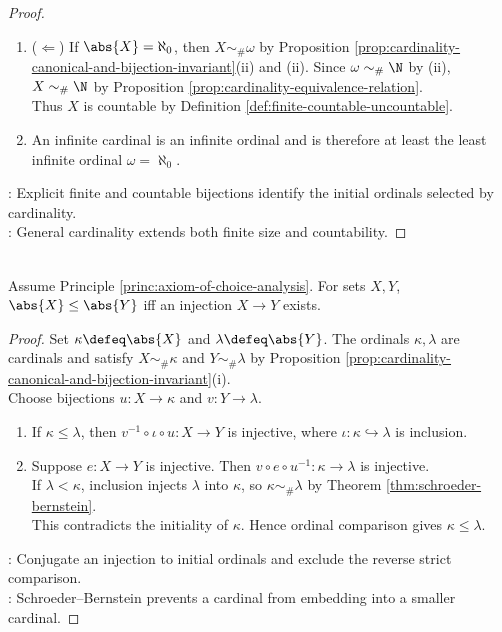 \begin{proposition}
\begin{proof}
\begin{enumerate}[label=(\roman*)]
Hence $\abs{X}=\aleph_0$ by Proposition \ref{prop:cardinality-canonical-and-bijection-invariant}(ii) and (ii).
\item[$(iii)$] ($\Leftarrow$) If $\abs{X}=\aleph_0$, then $X\sim_{\#}\omega$ by Proposition \ref{prop:cardinality-canonical-and-bijection-invariant}(ii) and (ii). Since $\omega\sim_{\#}\N$ by (ii), $X\sim_{\#}\N$ by Proposition \ref{prop:cardinality-equivalence-relation}.\\
Thus $X$ is countable by Definition \ref{def:finite-countable-uncountable}.
\item[$(iv)$] An infinite cardinal is an infinite ordinal and is therefore at least the least infinite ordinal $\omega=\aleph_0$.
\end{enumerate}
: Explicit finite and countable bijections identify the initial ordinals selected by cardinality.\\
: General cardinality extends both finite size and countability.
\end{proof}
\end{proposition}

\begin{proposition} \label{prop:ordinal-cardinality-comparison} \\
Assume Principle \ref{princ:axiom-of-choice-analysis}. For sets $X,Y$, $\abs{X}\leq\abs{Y}$ iff an injection $X\to Y$ exists.
\begin{proof}
Set $\kappa\defeq\abs{X}$ and $\lambda\defeq\abs{Y}$. The ordinals $\kappa,\lambda$ are cardinals and satisfy $X\sim_{\#}\kappa$ and $Y\sim_{\#}\lambda$ by Proposition \ref{prop:cardinality-canonical-and-bijection-invariant}(i).\\
Choose bijections $u:X\to\kappa$ and $v:Y\to\lambda$.
\begin{enumerate}[label=\roman*.]
\setlength{\itemsep}{0pt}
\item[$(\Rightarrow)$] If $\kappa\leq\lambda$, then $v^{-1}\circ\iota\circ u:X\to Y$ is injective, where $\iota:\kappa\hookrightarrow\lambda$ is inclusion.
\item[$(\Leftarrow)$] Suppose $e:X\to Y$ is injective. Then $v\circ e\circ u^{-1}:\kappa\to\lambda$ is injective.\\
If $\lambda<\kappa$, inclusion injects $\lambda$ into $\kappa$, so $\kappa\sim_{\#}\lambda$ by Theorem \ref{thm:schroeder-bernstein}.\\
This contradicts the initiality of $\kappa$. Hence ordinal comparison gives $\kappa\leq\lambda$.
\end{enumerate}
: Conjugate an injection to initial ordinals and exclude the reverse strict comparison.\\
: Schroeder--Bernstein prevents a cardinal from embedding into a smaller cardinal.
\end{proof}
\end{proposition}

